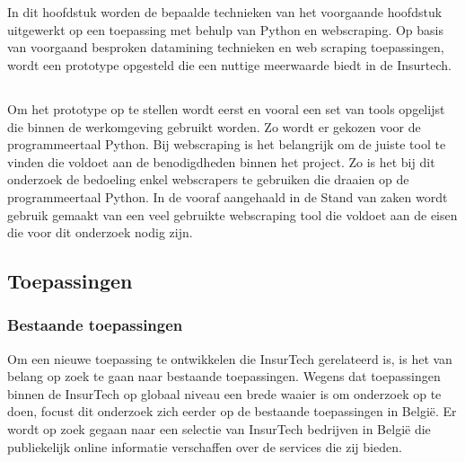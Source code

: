 \chapter{}
\label{ch:prototype}

\section{}
\label{sec:inleiding}

In dit hoofdstuk worden de bepaalde technieken van het voorgaande hoofdstuk uitgewerkt op een toepassing met behulp van Python en webscraping. Op basis van voorgaand besproken datamining technieken en web scraping toepassingen, wordt een prototype opgesteld die een nuttige meerwaarde biedt in de Insurtech.

\section{}
\label{sec:Gebruikte tools}

Om het prototype op te stellen wordt eerst en vooral een set van tools opgelijst die binnen de werkomgeving gebruikt worden. Zo wordt er gekozen voor de programmeertaal Python.
Bij webscraping is het belangrijk om de juiste tool te vinden die voldoet aan de benodigdheden binnen het project. Zo is het bij dit onderzoek de bedoeling enkel webscrapers te gebruiken die draaien op de programmeertaal Python. In de vooraf aangehaald in de Stand van zaken wordt gebruik gemaakt van een veel gebruikte webscraping tool die voldoet aan de eisen die voor dit onderzoek nodig zijn.

\section{Toepassingen}

\subsection{Bestaande toepassingen}

Om een nieuwe toepassing te ontwikkelen die InsurTech gerelateerd is, is het van belang op zoek te gaan naar bestaande toepassingen. Wegens dat toepassingen binnen de InsurTech op globaal niveau een brede waaier is om onderzoek op te doen, focust dit onderzoek zich eerder op de bestaande toepassingen in België. Er wordt op zoek gegaan naar een selectie van InsurTech bedrijven in België die publiekelijk online informatie verschaffen over de services die zij bieden. 

